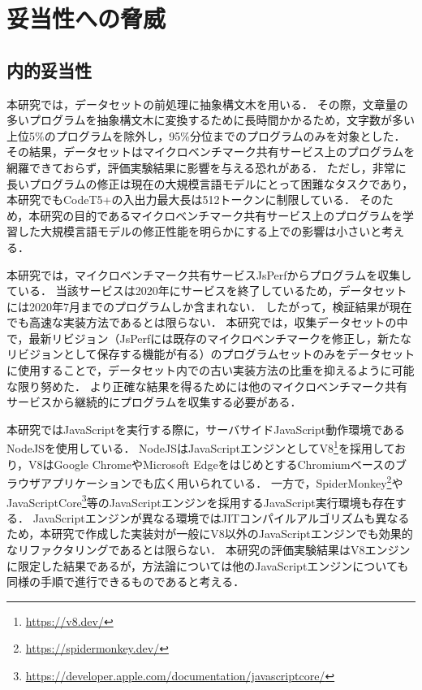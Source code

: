 \documentclass[11pt]{jreport}
\begin{document}


\chapter{妥当性への脅威}\label{chapter:threats}




\section{内的妥当性}


本研究では，データセットの前処理に抽象構文木を用いる．
その際，文章量の多いプログラムを抽象構文木に変換するために長時間かかるため，文字数が多い上位5\%のプログラムを除外し，95\%分位までのプログラムのみを対象とした．
その結果，データセットはマイクロベンチマーク共有サービス上のプログラムを網羅できておらず，評価実験結果に影響を与える恐れがある．
ただし，非常に長いプログラムの修正は現在の大規模言語モデルにとって困難なタスクであり，本研究でもCodeT5+の入出力最大長は512トークンに制限している．
そのため，本研究の目的であるマイクロベンチマーク共有サービス上のプログラムを学習した大規模言語モデルの修正性能を明らかにする上での影響は小さいと考える．

本研究では，マイクロベンチマーク共有サービスJsPerfからプログラムを収集している．
当該サービスは2020年にサービスを終了しているため，データセットには2020年7月までのプログラムしか含まれない．
したがって，検証結果が現在でも高速な実装方法であるとは限らない．
本研究では，収集データセットの中で，最新リビジョン（JsPerfには既存のマイクロベンチマークを修正し，新たなリビジョンとして保存する機能が有る）のプログラムセットのみをデータセットに使用することで，データセット内での古い実装方法の比重を抑えるように可能な限り努めた．
より正確な結果を得るためには他のマイクロベンチマーク共有サービスから継続的にプログラムを収集する必要がある．

本研究ではJavaScriptを実行する際に，サーバサイドJavaScript動作環境であるNodeJSを使用している．
NodeJSはJavaScriptエンジンとしてV8\footnote{\url{https://v8.dev/}}を採用しており，V8はGoogle ChromeやMicrosoft EdgeをはじめとするChromiumベースのブラウザアプリケーションでも広く用いられている．
一方で，SpiderMonkey\footnote{\url{https://spidermonkey.dev/}}やJavaScriptCore\footnote{\url{https://developer.apple.com/documentation/javascriptcore/}}等のJavaScriptエンジンを採用するJavaScript実行環境も存在する．
JavaScriptエンジンが異なる環境ではJITコンパイルアルゴリズムも異なるため，本研究で作成した実装対が一般にV8以外のJavaScriptエンジンでも効果的なリファクタリングであるとは限らない．
本研究の評価実験結果はV8エンジンに限定した結果であるが，方法論については他のJavaScriptエンジンについても同様の手順で進行できるものであると考える．
\end{document}
